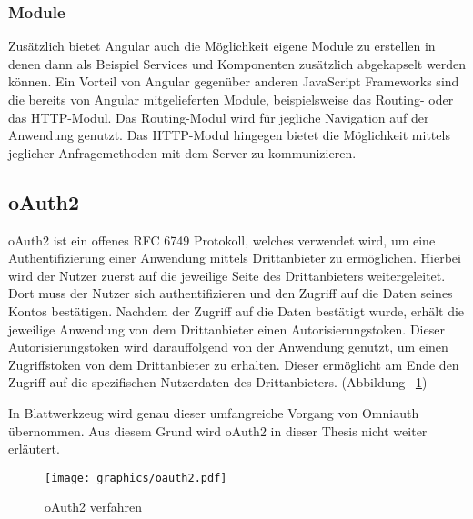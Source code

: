 \subsubsection{Module}
\label{sec: ang-modul}
Zusätzlich bietet Angular auch die Möglichkeit eigene Module zu erstellen in denen dann als Beispiel Services und Komponenten zusätzlich abgekapselt werden können. Ein Vorteil von Angular gegenüber anderen JavaScript Frameworks sind die bereits von Angular mitgelieferten Module, beispielsweise das Routing- oder das HTTP-Modul. Das Routing-Modul wird für jegliche Navigation auf der Anwendung genutzt. Das \gls{HTTP}-Modul hingegen bietet die Möglichkeit mittels jeglicher Anfragemethoden mit dem Server zu kommunizieren.

\subsection{oAuth2}
\label{sec: oauth2}
\gls{oAuth2} ist ein offenes \gls{RFC} 6749 Protokoll, welches verwendet wird, um eine Authentifizierung einer Anwendung mittels Drittanbieter zu ermöglichen. Hierbei wird der Nutzer zuerst auf die jeweilige Seite des Drittanbieters weitergeleitet. Dort muss der Nutzer sich authentifizieren und den Zugriff auf die Daten seines Kontos bestätigen. Nachdem der Zugriff auf die Daten bestätigt wurde, erhält die jeweilige Anwendung von dem Drittanbieter einen Autorisierungstoken. Dieser Autorisierungstoken wird darauffolgend von der Anwendung genutzt, um einen Zugriffstoken von dem Drittanbieter zu erhalten. Dieser ermöglicht am Ende den Zugriff auf die spezifischen Nutzerdaten des Drittanbieters. (Abbildung ~\ref{fig:oauth2})

In Blattwerkzeug wird genau dieser umfangreiche Vorgang von Omniauth übernommen. Aus diesem Grund wird oAuth2 in dieser Thesis nicht weiter erläutert.

\begin{figure}[h]
	\centering
	\texttt{[image: graphics/oauth2.pdf]}
	\caption{oAuth2 verfahren}
	\label{fig:oauth2}
\end{figure}

